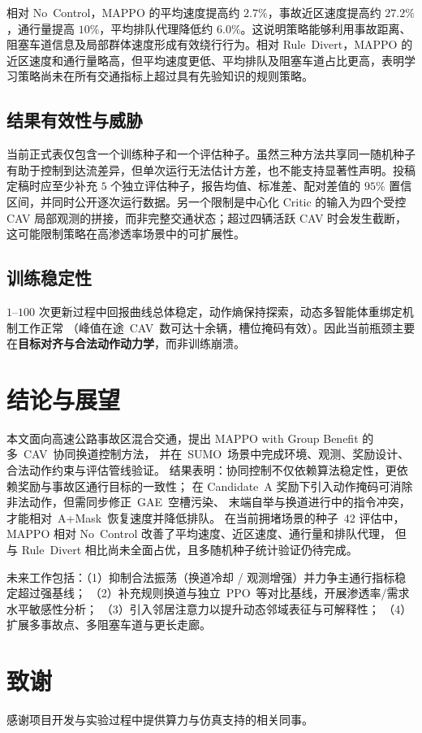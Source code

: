 \documentclass[UTF8,a4paper,11pt]{ctexart}
\begin{document}
相对 No~Control，MAPPO 的平均速度提高约 $2.7\%$，事故近区速度提高约 $27.2\%$，通行量提高 $10\%$，平均排队代理降低约 $6.0\%$。这说明策略能够利用事故距离、阻塞车道信息及局部群体速度形成有效绕行行为。相对 Rule~Divert，MAPPO 的近区速度和通行量略高，但平均速度更低、平均排队及阻塞车道占比更高，表明学习策略尚未在所有交通指标上超过具有先验知识的规则策略。

\subsection{结果有效性与威胁}
当前正式表仅包含一个训练种子和一个评估种子。虽然三种方法共享同一随机种子有助于控制到达流差异，但单次运行无法估计方差，也不能支持显著性声明。投稿定稿时应至少补充 $5$ 个独立评估种子，报告均值、标准差、配对差值的 $95\%$ 置信区间，并同时公开逐次运行数据。另一个限制是中心化 Critic 的输入为四个受控 CAV 局部观测的拼接，而非完整交通状态；超过四辆活跃 CAV 时会发生截断，这可能限制策略在高渗透率场景中的可扩展性。
\subsection{训练稳定性}
$1$–$100$ 次更新过程中回报曲线总体稳定，动作熵保持探索，动态多智能体重绑定机制工作正常
（峰值在途~CAV~数可达十余辆，槽位掩码有效）。因此当前瓶颈主要在\textbf{目标对齐与合法动作动力学}，而非训练崩溃。

\section{结论与展望}

本文面向高速公路事故区混合交通，提出 MAPPO with Group Benefit 的多~CAV~协同换道控制方法，
并在~SUMO~场景中完成环境、观测、奖励设计、合法动作约束与评估管线验证。
结果表明：协同控制不仅依赖算法稳定性，更依赖奖励与事故区通行目标的一致性；
在 Candidate~A 奖励下引入动作掩码可消除非法动作，但需同步修正~GAE~空槽污染、
末端自举与换道进行中的指令冲突，才能相对~A+Mask~恢复速度并降低排队。
在当前拥堵场景的种子~42 评估中，MAPPO 相对 No~Control 改善了平均速度、近区速度、通行量和排队代理，
但与 Rule~Divert 相比尚未全面占优，且多随机种子统计验证仍待完成。

未来工作包括：（1）抑制合法振荡（换道冷却 / 观测增强）并力争主通行指标稳定超过强基线；
（2）补充规则换道与独立~PPO~等对比基线，开展渗透率/需求水平敏感性分析；
（3）引入邻居注意力以提升动态邻域表征与可解释性；
（4）扩展多事故点、多阻塞车道与更长走廊。

\section*{致谢}
感谢项目开发与实验过程中提供算力与仿真支持的相关同事。



\end{document}
